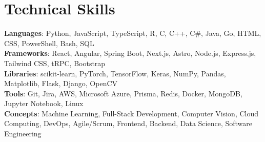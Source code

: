 \documentclass[letterpaper,11pt]{article}
\begin{document}
\section{Technical Skills}
 \begin{itemize}[leftmargin=0.15in, label={}]
    \small{\item{
     \textbf{Languages}{: Python, JavaScript, TypeScript, R, C, C++, C\#, Java, Go, HTML, CSS, PowerShell, Bash, SQL} \\
     \textbf{Frameworks}{: React, Angular, Spring Boot, Next.js, Astro, Node.js, Express.js, Tailwind CSS, tRPC, Bootstrap} \\
     \textbf{Libraries}{: scikit-learn, PyTorch, TensorFlow, Keras, NumPy, Pandas, Matplotlib, Flask, Django, OpenCV} \\
     \textbf{Tools}{: Git, Jira, AWS, Microsoft Azure, Prisma, Redis, Docker, MongoDB, Jupyter Notebook, Linux} \\
    \textbf{Concepts}{: Machine Learning, Full-Stack Development, Computer Vision,
    Cloud Computing, DevOps, Agile/Scrum, Frontend, Backend, Data Science, Software Engineering} \\
    }}
 \end{itemize}

\end{document}
